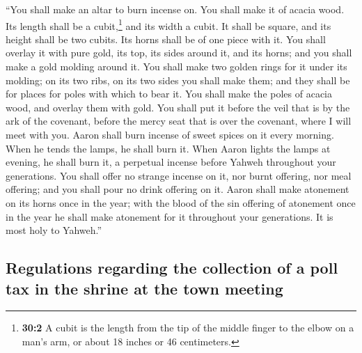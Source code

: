  ``You shall make an altar to burn incense on. You shall
make it of acacia wood.  Its length shall be a
cubit,\footnote{\textbf{30:2} A cubit is the length from the tip of the
  middle finger to the elbow on a man's arm, or about 18 inches or 46
  centimeters.} and its width a cubit. It shall be square, and its
height shall be two cubits. Its horns shall be of one piece with it.
 You shall overlay it with pure gold, its top, its sides
around it, and its horns; and you shall make a gold molding around it.
 You shall make two golden rings for it under its molding;
on its two ribs, on its two sides you shall make them; and they shall be
for places for poles with which to bear it.  You shall
make the poles of acacia wood, and overlay them with gold.
 You shall put it before the veil that is by the ark of
the covenant, before the mercy seat that is over the covenant, where I
will meet with you.  Aaron shall burn incense of sweet
spices on it every morning. When he tends the lamps, he shall burn it.
 When Aaron lights the lamps at evening, he shall burn it,
a perpetual incense before Yahweh throughout your generations.
 You shall offer no strange incense on it, nor burnt
offering, nor meal offering; and you shall pour no drink offering on it.
 Aaron shall make atonement on its horns once in the
year; with the blood of the sin offering of atonement once in the year
he shall make atonement for it throughout your generations. It is most
holy to Yahweh.''

\hypertarget{regulations-regarding-the-collection-of-a-poll-tax-in-the-shrine-at-the-town-meeting}{%
\subsection{Regulations regarding the collection of a poll tax in the
shrine at the town
meeting}\label{regulations-regarding-the-collection-of-a-poll-tax-in-the-shrine-at-the-town-meeting}}

